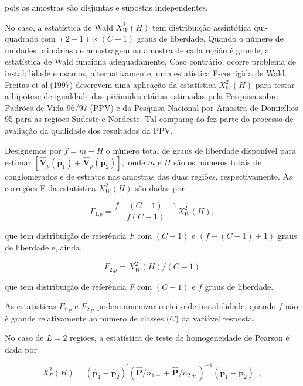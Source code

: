 \documentclass[]{book}
\theoremstyle{definition}
\theoremstyle{definition}
\theoremstyle{definition}
\theoremstyle{remark}
\begin{document}
pois as amostras são disjuntas e supostas independentes.

No caso, a estatística de Wald \(X_{W}^{2}\left( H\right)\) tem
distribuição assintótica qui-quadrado com
\(\left( 2-1\right) \times \left( C-1\right)\) graus de liberdade.
Quando o número de unidades primárias de amostragem na amostra de cada
região é grande, a estatística de Wald funciona adequadamente. Caso
contrário, ocorre problema de instabilidade e usamos, alternativamente,
uma estatística F-corrigida de Wald. Freitas et al.(1997) descrevem uma
aplicação da estatística \(X_{W}^{2}\left( H\right)\) para testar a
hipótese de igualdade das pirâmides etárias estimadas pela Pesquisa
sobre Padrões de Vida 96/97 (PPV) e da Pesquisa Nacional por Amostra de
Domicílios 95 para as regiões Sudeste e Nordeste. Tal compara\c{c
}ão fez parte do processo de avaliação da qualidade dos resultados da
PPV.

Designemos por \(f=m-H\) o número total de graus de liberdade disponível
para estimar
\(\left[ \mathbf{\hat{V}}_{p}\left( \widehat{ \mathbf{p}}_{1}\right) +\mathbf{\hat{V}}_{p}\left( \widehat{\mathbf{p}} _{2}\right) \right] ,\)
onde \(m\) e \(H\) são os números totais de conglomerados e de estratos
nas amostras das duas regiões, respectivamente. As correções F da
estatística \(X_{W}^{2}\left( H\right)\) são dadas por

\begin{equation}
F_{1.p}=\frac{f-\left( C-1\right) +1}{f\left( C-1\right) }X_{W}^{2}\left(
H\right) , \label{eq:Tab2} 
\end{equation}

que tem distribuição de referência \(F\) com \(\left(C-1\right)\) e
\(\left( f-\left( C-1\right)+1\right)\) graus de liberdade e, ainda,

\begin{equation}
F_{2.p}=X_{W}^{2}\left( H\right) /\left(C-1\right) \label{eq:Tab3}
\end{equation}

que tem distribuição de referência \emph{F} com \(\left(C-1\right)\) e
\(f\) graus de liberdade.

As estatísticas \(F_{1.p}\) e \(F_{2.p}\) podem amenizar o efeito de
instabilidade, quando \(f\) não é grande relativamente ao número de
classes (\(C\)) da variável resposta.

No caso de \(L=2\) regiões, a estatística de teste de homogeneidade de
Pearson é dada por

\begin{equation}
X_{P}^{2}\left( H\right) =\left( \mathbf{\hat{p}}_{1}-\mathbf{\hat{p}}
_{2}\right) ^{^{\prime }}\left( \mathbf{\hat{P}}/\widehat{n}_{1+}+\mathbf{
\hat{P}}/\widehat{n}_{2+}\right) ^{-1}\left( \mathbf{\hat{p}}_{1}-\mathbf{
\hat{p}}_{2}\right) \;\;,  \label{eq:Tab4}
\end{equation}
\end{document}
